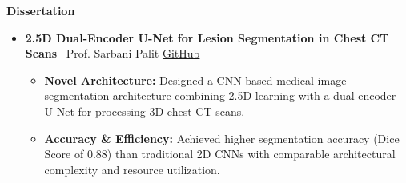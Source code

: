 \documentclass[10pt,article]{article}
\newcommand{\resheading}[1]{%
 \vspace{7pt}%
 \noindent\colorbox{mygrey}{\parbox{\dimexpr\textwidth-2\fboxsep\relax}{\textbf{\small #1}}}%
 \vspace{4pt}%
}
\begin{document}
\resheading{Dissertation}
\begin{itemize}
   \item \textbf{2.5D Dual-Encoder U-Net for Lesion Segmentation in Chest CT Scans} \textbar\ Prof. Sarbani Palit \hfill \href{YOUR_GITHUB_LINK}{GitHub}
   \begin{itemize}
       \item \textbf{Novel Architecture:} Designed a CNN-based medical image segmentation architecture combining 2.5D learning with a dual-encoder U-Net for processing 3D chest CT scans.
       \item \textbf{Accuracy \& Efficiency:} Achieved higher segmentation accuracy (Dice Score of 0.88) than traditional 2D CNNs with comparable architectural complexity and resource utilization.
   \end{itemize}
\end{itemize}
\end{document}
